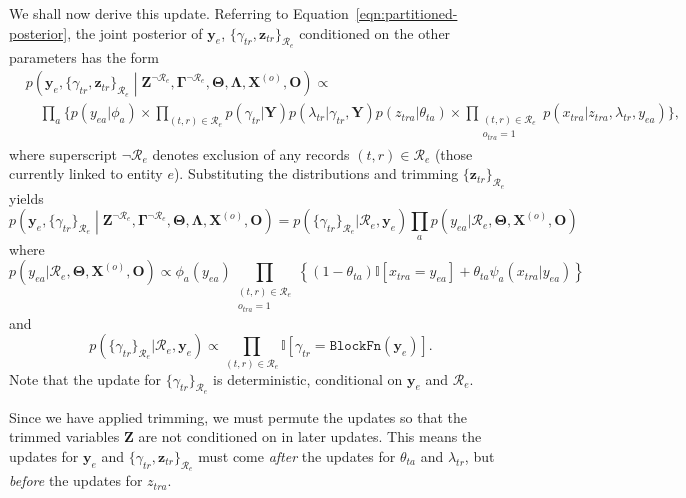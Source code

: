 \documentclass[12pt,letterpaper]{article}
\renewcommand\vec{\bm}
\newcommand{\blockfn}{\mathtt{BlockFn}} %
\newcommand{\entset}{\mathcal{R}} %
\newcommand{\1}[1]{\mathbb{I}\!\left[#1\right]} %
\begin{document}
We shall now derive this update. 
Referring to Equation~\ref{eqn:partitioned-posterior}, the joint 
posterior of $\vec{y}_{e}$, $\{\gamma_{tr}, 
\vec{z}_{tr}\}_{\entset_{e}}$ conditioned on the other parameters 
has the form
\begin{equation*}
\begin{split}
& p\!\left(\vec{y}_{e}, \{\gamma_{tr}, \vec{z}_{tr}\}_{\entset_{e}} \middle| 
  \vec{Z}^{\neg \entset_{e}}, \vec{\Gamma}^{\neg \entset_{e}}, \vec{\Theta}, 
    \vec{\Lambda}, \vec{X}^{(o)}, \vec{O}\right) \propto \\
& \quad \prod_{a} \Big\{ p(y_{ea}|\phi_{a}) \times  \prod_{(t,r) \in \entset_{e}} 
  p(\gamma_{tr}|\vec{Y}) p(\lambda_{tr}|\gamma_{tr}, \vec{Y}) p(z_{tra}|\theta_{ta}) 
    \times \prod_{\substack{(t,r) \in \entset_{e}\\o_{tra}=1}} p(x_{tra} | z_{tra}, \lambda_{tr}, y_{ea}) \Big\},
\end{split}
\end{equation*}
where superscript $\neg \entset_{e}$ denotes exclusion of 
any records $(t,r) \in \entset_{e}$ (those currently linked to entity $e$).
Substituting the distributions and trimming 
$\{\vec{z}_{tr}\}_{\entset_{e}}$ yields
\begin{equation}
p\!\left(\vec{y}_{e}, \{\gamma_{tr}\}_{\entset_{e}} \middle| 
  \vec{Z}^{\neg \entset_{e}}, \vec{\Gamma}^{\neg \entset_{e}}, \vec{\Theta}, 
  \vec{\Lambda}, \vec{X}^{(o)}, \vec{O} \right) = p(\{\gamma_{tr}\}_{\entset_{e}}|\entset_{e}, \vec{y}_{e}) 
  \prod_{a} p(y_{ea}|\entset_{e}, \vec{\Theta}, \vec{X}^{(o)}, \vec{O})
\label{eqn:y-gamma-update}
\end{equation}
where
\begin{equation*}
p(y_{ea}|\entset_{e}, \vec{\Theta}, \vec{X}^{(o)}, \vec{O}) 
  \propto \phi_{a}(y_{ea}) \prod_{\substack{(t,r) \in \entset_{e}\\o_{tra}=1}} 
  \left\{(1 - \theta_{ta}) \1{x_{tra} = y_{ea}} 
  + \theta_{ta} \psi_{a}(x_{tra}|y_{ea}) \right\}
\end{equation*}
and
\begin{equation*}
p(\{\gamma_{tr}\}_{\entset_{e}}|\entset_{e}, \vec{y}_{e}) \propto \prod_{(t,r) \in 
\entset_{e}} \1{\gamma_{tr} = \blockfn(\vec{y}_{e})}.
\end{equation*}
Note that the update for $\{\gamma_{tr}\}_{\entset_{e}}$ is 
deterministic, conditional on $\vec{y}_{e}$ and $\entset_e$.

Since we have applied trimming, we must permute the updates so that 
the trimmed variables $\vec{Z}$ are not conditioned on in later 
updates.
This means the updates for $\vec{y}_{e}$ and $\{\gamma_{tr}, 
\vec{z}_{tr}\}_{\entset_{e}}$ must come \emph{after} the updates 
for $\theta_{ta}$ and $\lambda_{tr}$, but \emph{before} the updates 
for $z_{tra}$.
\end{document}
